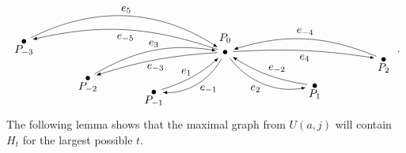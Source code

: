 \documentclass{amsproc}
\theoremstyle{definition}
\theoremstyle{remark}
\numberwithin{equation}{section}
\newcommand{\nodeDist}{2}
\begin{document}
\[%
\begin{tikzpicture}[baseline, vertex/.style={anchor = base, circle, fill,minimum size=4pt, inner sep=0pt, outer sep=0pt},auto,
                               edge/.style={->,>=latex, shorten > = 6pt,shorten < = 5pt},
position/.style args={#1:#2 from #3}{
    at=(#3.#1), anchor=#1+180, shift=(#1:#2)
}]

  \node[vertex] (v0) {};
  \coordinate[position=270:{\nodeDist*0.7} from v0]  (z0) {};
  \node[vertex,position = 175:{\nodeDist*1.1} from z0] (v1L) {};
  \node[vertex,position = 168:{\nodeDist} from v1L] (v2L) {};
  \node[vertex,position = 150:{\nodeDist*1.1} from v2L] (v3L) {};
  \node[vertex,position = 8:{\nodeDist*1.4} from z0] (v1R) {};
  \node[vertex,position = 21:{\nodeDist*1.1} from v1R] (v2R) {};

  \draw (v0) node[above=5] {$P_0$};
  \draw (v1L) node[below] {$P_{-1}$};
  \draw (v2L) node[below] {$P_{-2}$};
  \draw (v3L) node[below] {$P_{-3}$};
  \draw (v1R) node[below] {$P_{1}$};
  \draw (v2R) node[below] {$P_{2}$};

  \draw[edge] (v0) to [bend left=32] node[below=5, right=0] {$e_{-1}$} (v1L);
  \draw[edge] (v1L) to [bend right=12] node[above=4, left=-3] {$e_1$} (v0);

  \draw[edge] (v0) to [bend right=7] node[below] {$e_{-3}$} (v2L);
  \draw[edge] (v2L) to [bend left=20] node[above] {$e_{3}$} (v0);


  \draw[edge] (v0) to [bend right=16] node[below] {$e_{-5}$} (v3L);
  \draw[edge] (v3L) to [bend left=30] node[above] {$e_{5}$} (v0);
  


  \draw[edge] (v0) to [bend right=32] node[below=5, left=0] {$e_2$} (v1R);
  \draw[edge] (v1R) to [bend left=12] node[above=5, right=-3] {$e_{-2}$} (v0);


  \draw[edge] (v0) to [bend left=6] node[below] {$e_{4}$} (v2R);
  \draw[edge] (v2R) to [bend right=20] node[above] {$e_{-4}$} (v0);

\end{tikzpicture}\ .
\]
The following lemma shows that the maximal graph from $U(a,j)$ will contain $H_t$ for the largest possible $t$.
\end{document}

